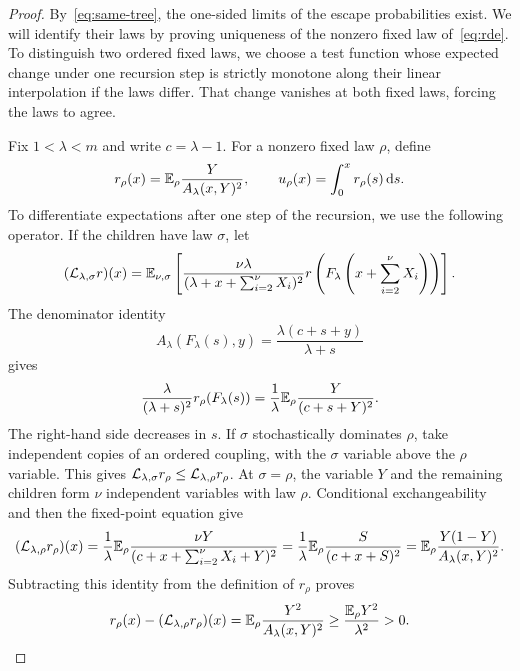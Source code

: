 \begin{proof}
By~\eqref{eq:same-tree}, the one-sided limits of the escape probabilities exist. We will identify their laws by proving uniqueness of the nonzero fixed law of~\eqref{eq:rde}. To distinguish two ordered fixed laws, we choose a test function whose expected change under one recursion step is strictly monotone along their linear interpolation if the laws differ. That change vanishes at both fixed laws, forcing the laws to agree.

Fix $1<\lambda<m$ and write $c=\lambda-1$. For a nonzero fixed law $\rho$, define
\begin{equation*}
 r_\rho(x)=\mathbb E_\rho\frac{Y}{A_\lambda(x,Y)^2},\qquad
 u_\rho(x)=\int_0^x r_\rho(s)\,\mathrm d s.
\end{equation*}
To differentiate expectations after one step of the recursion, we use the following operator. If the children have law $\sigma$, let
\begin{equation}\label{eq:linear-operator}
 (\mathcal L_{\lambda,\sigma}r)(x)=
 \mathbb E_{\nu,\sigma}\left[
 \frac{\nu\lambda}{(\lambda+x+\sum_{i=2}^{\nu}X_i)^2}
 r\left(F_\lambda\left(x+\sum_{i=2}^{\nu}X_i\right)\right)\right].
\end{equation}
The denominator identity
\begin{equation}\label{eq:denominator-cancellation}
 A_\lambda(F_\lambda(s),y)=\frac{\lambda(c+s+y)}{\lambda+s}
\end{equation}
gives
\begin{equation*}
 \frac{\lambda}{(\lambda+s)^2}r_\rho(F_\lambda(s))
 =\frac1\lambda\mathbb E_\rho\frac{Y}{(c+s+Y)^2}.
\end{equation*}
The right-hand side decreases in $s$. If $\sigma$ stochastically dominates $\rho$, take independent copies of an ordered coupling, with the $\sigma$ variable above the $\rho$ variable. This gives $\mathcal L_{\lambda,\sigma}r_\rho\le\mathcal L_{\lambda,\rho}r_\rho$. At $\sigma=\rho$, the variable $Y$ and the remaining children form $\nu$ independent variables with law $\rho$. Conditional exchangeability and then the fixed-point equation give
\[
 (\mathcal L_{\lambda,\rho}r_\rho)(x)
 =\frac1\lambda\mathbb E_\rho\frac{\nu Y}{(c+x+\sum_{i=2}^{\nu}X_i+Y)^2}
 =\frac1\lambda\mathbb E_\rho\frac{S}{(c+x+S)^2}
 =\mathbb E_\rho\frac{Y(1-Y)}{A_\lambda(x,Y)^2}.
\]
Subtracting this identity from the definition of $r_\rho$ proves
\begin{equation}\label{eq:positive-gap}
 r_\rho(x)-(\mathcal L_{\lambda,\rho}r_\rho)(x)
 =\mathbb E_\rho\frac{Y^2}{A_\lambda(x,Y)^2}
 \ge\frac{\mathbb E_\rho Y^2}{\lambda^2}>0.
\end{equation}


\end{proof}
